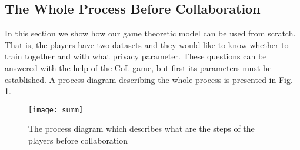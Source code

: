 \documentclass[USenglish,oneside,twocolumn]{article}
\theoremstyle{plain}
\begin{document}
    
    \vspace{-0.5cm}
    \subsection{The Whole Process Before Collaboration}
    \vspace{-0.25cm}
    
    In this section we show how our game theoretic model can be used from scratch. That is, the players have two datasets and they would like to know whether to train together and with what privacy parameter. These questions can be answered with the help of the CoL game, but first its parameters must be established. A process diagram describing the whole process is presented in Fig. \ref{fig:summ}.
    
    \vspace{-0.25cm}
    \begin{figure}[h!]
        \centering
        \texttt{[image: summ]}
        \caption{The process diagram which describes what are the steps of the players before collaboration}
        \label{fig:summ}
    \end{figure}
    \vspace{-0.25cm}
    
\end{document}
